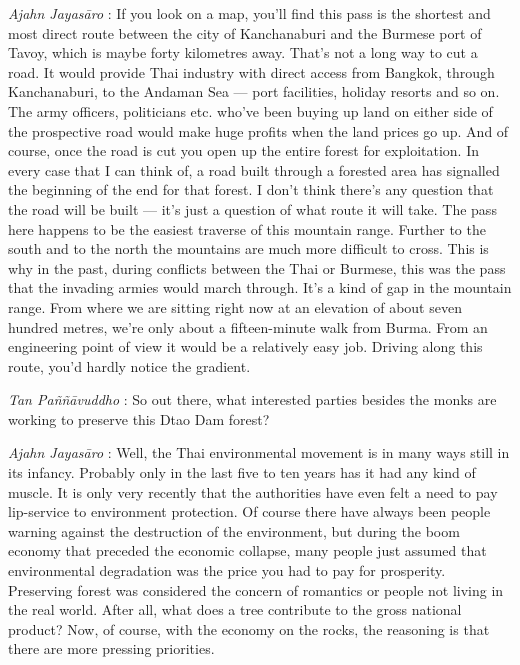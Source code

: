 \emph{Ajahn Jayasāro }: If you look on a map, you'll find this pass is
the shortest and most direct route between the city of Kanchanaburi and
the Burmese port of Tavoy, which is maybe forty kilometres away. That's
not a long way to cut a road. It would provide Thai industry with direct
access from Bangkok, through Kanchanaburi, to the Andaman Sea --- port
facilities, holiday resorts and so on. The army officers, politicians
etc. who've been buying up land on either side of the prospective road
would make huge profits when the land prices go up. And of course, once
the road is cut you open up the entire forest for exploitation. In every
case that I can think of, a road built through a forested area has
signalled the beginning of the end for that forest. I don't think
there's any question that the road will be built --- it's just a
question of what route it will take. The pass here happens to be the
easiest traverse of this mountain range. Further to the south and to the
north the mountains are much more difficult to cross. This is why in the
past, during conflicts between the Thai or Burmese, this was the pass
that the invading armies would march through. It's a kind of gap in the
mountain range. From where we are sitting right now at an elevation of
about seven hundred metres, we're only about a fifteen-minute walk from
Burma. From an engineering point of view it would be a relatively easy
job. Driving along this route, you'd hardly notice the gradient.

\emph{Tan Paññāvuddho} : So out there, what interested parties besides
the monks are working to preserve this Dtao Dam forest?

\emph{Ajahn Jayasāro }: Well, the Thai environmental movement is in many
ways still in its infancy. Probably only in the last five to ten years
has it had any kind of muscle. It is only very recently that the
authorities have even felt a need to pay lip-service to environment
protection. Of course there have always been people warning against the
destruction of the environment, but during the boom economy that
preceded the economic collapse, many people just assumed that
environmental degradation was the price you had to pay for prosperity.
Preserving forest was considered the concern of romantics or people not
living in the real world. After all, what does a tree contribute to the
gross national product? Now, of course, with the economy on the rocks,
the reasoning is that there are more pressing priorities.


